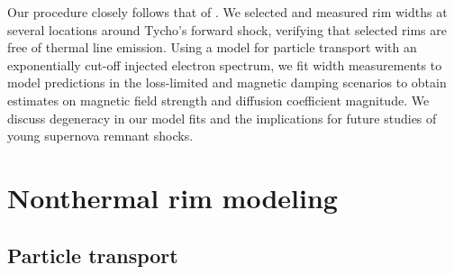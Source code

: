 \documentclass[iop, apj, numberedappendix]{emulateapj}
\begin{document}
Our procedure closely follows that of .
We selected and measured rim widths at several locations around Tycho's forward
shock, verifying that selected rims are free of thermal line emission.  Using a
model for particle transport with an exponentially cut-off injected electron
spectrum, we fit width measurements to model predictions in the loss-limited
and magnetic damping scenarios to obtain estimates on magnetic field strength
and diffusion coefficient magnitude.  We discuss degeneracy in our model fits
and the implications for future studies of young supernova remnant shocks.

\section{Nonthermal rim modeling}\label{sec:models}



\subsection{Particle transport}\label{sec:transport}
\end{document}
